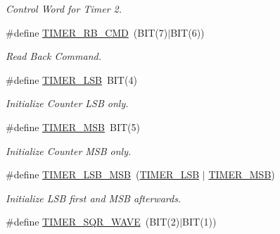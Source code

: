 \begin{DoxyCompactItemize}
\begin{DoxyCompactList}\small\item\em Control Word for Timer 2. \end{DoxyCompactList}\item 
\hypertarget{group__i8254_ga4c2eecbfb96744a9c2af71dba75ecb18}{\#define \hyperlink{group__i8254_ga4c2eecbfb96744a9c2af71dba75ecb18}{T\-I\-M\-E\-R\-\_\-\-R\-B\-\_\-\-C\-M\-D}~(B\-I\-T(7)$|$B\-I\-T(6))}\label{group__i8254_ga4c2eecbfb96744a9c2af71dba75ecb18}

\begin{DoxyCompactList}\small\item\em Read Back Command. \end{DoxyCompactList}\item 
\hypertarget{group__i8254_gac18cb814ebd0d67235392c330e0e3504}{\#define \hyperlink{group__i8254_gac18cb814ebd0d67235392c330e0e3504}{T\-I\-M\-E\-R\-\_\-\-L\-S\-B}~B\-I\-T(4)}\label{group__i8254_gac18cb814ebd0d67235392c330e0e3504}

\begin{DoxyCompactList}\small\item\em Initialize Counter L\-S\-B only. \end{DoxyCompactList}\item 
\hypertarget{group__i8254_ga2a8a6d363c612d756cd8d78480f7cd04}{\#define \hyperlink{group__i8254_ga2a8a6d363c612d756cd8d78480f7cd04}{T\-I\-M\-E\-R\-\_\-\-M\-S\-B}~B\-I\-T(5)}\label{group__i8254_ga2a8a6d363c612d756cd8d78480f7cd04}

\begin{DoxyCompactList}\small\item\em Initialize Counter M\-S\-B only. \end{DoxyCompactList}\item 
\hypertarget{group__i8254_ga8c0f1933323274c765e23837e4fbc8c7}{\#define \hyperlink{group__i8254_ga8c0f1933323274c765e23837e4fbc8c7}{T\-I\-M\-E\-R\-\_\-\-L\-S\-B\-\_\-\-M\-S\-B}~(\hyperlink{group__i8254_gac18cb814ebd0d67235392c330e0e3504}{T\-I\-M\-E\-R\-\_\-\-L\-S\-B} $|$ \hyperlink{group__i8254_ga2a8a6d363c612d756cd8d78480f7cd04}{T\-I\-M\-E\-R\-\_\-\-M\-S\-B})}\label{group__i8254_ga8c0f1933323274c765e23837e4fbc8c7}

\begin{DoxyCompactList}\small\item\em Initialize L\-S\-B first and M\-S\-B afterwards. \end{DoxyCompactList}\item 
\hypertarget{group__i8254_ga4745cbf21da3d3fea5dbb080b2b73bac}{\#define \hyperlink{group__i8254_ga4745cbf21da3d3fea5dbb080b2b73bac}{T\-I\-M\-E\-R\-\_\-\-S\-Q\-R\-\_\-\-W\-A\-V\-E}~(B\-I\-T(2)$|$B\-I\-T(1))}\label{group__i8254_ga4745cbf21da3d3fea5dbb080b2b73bac}


\end{DoxyCompactItemize}
